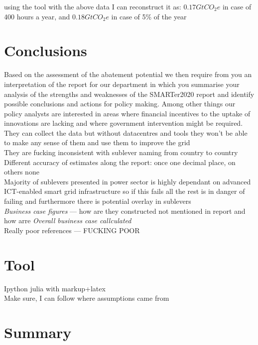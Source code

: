\documentclass[11pt, twocolumn]{article}
\begin{document}
using the tool with the above data I can reconstruct it as: $0.17 GtCO_2e$ in case of 400 hours a year, and $0.18 GtCO_2e$ in case of 5\% of the year


\section{Conclusions}
Based on the assessment of the abatement potential we then require from you an interpretation of the report for our department in which you summarise your analysis of the strengths and weaknesses of the SMARTer2020 report and identify possible conclusions and actions for policy making. Among other things our policy analysts are interested in areas where financial incentives to the uptake of innovations are lacking and where government intervention might be required.\\

They can collect the data but without datacentres and tools they won't be able to make any sense of them and use them to improve the grid\\

They are fucking inconsistent with sublever naming from country to country\\

Different accuracy of estimates along the report: once one decimal place, on others none\\

Majority of sublevers presented in power sector is highly dependant on advanced ICT-enabled smart grid infrastructure so if this fails all the rest is in danger of failing and furthermore there is potential overlay in sublevers\\

\emph{Business case figures} --- how are they constructed not mentioned in report and how arre \emph{Overall business case callculated}\\

Really poor references --- FUCKING POOR

\section{Tool}
Ipython julia with markup+latex\\
Make sure, I can follow where assumptions came from

\section{Summary}

{}

\end{document}
